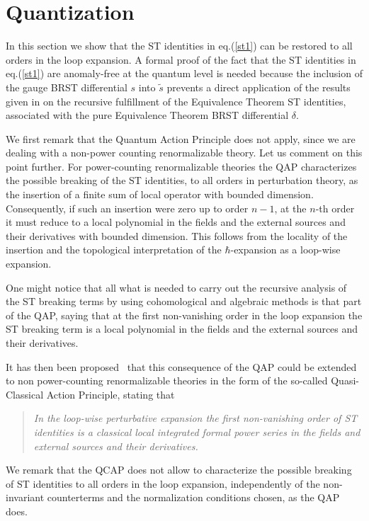 \documentclass[a4paper,11pt]{article}
\begin{document}
\section{Quantization}\label{sec4}

In this section we show that 
the ST identities in eq.(\ref{st1}) can be restored
to all orders in the loop expansion. 
A formal proof of the fact that the ST identities in eq.(\ref{st1}) 
are anomaly-free at the quantum level is needed because
the inclusion of the gauge BRST differential $s$ into $\tilde s$
prevents a direct application of the results given in \cite{ET}
on the recursive fulfillment of the Equivalence Theorem ST identities,
associated with the pure Equivalence Theorem 
BRST differential $\delta$.

We first remark that
the Quantum Action Principle \cite{qap1,qap2,qap3,qap4,Piguet:er} does not apply,
since we are dealing with a non-power counting renormalizable theory.
%
Let us comment on this point further.
For  power-counting renormalizable theories the QAP characterizes
 the possible breaking of the ST identities, to all orders in perturbation theory,
 as the insertion of a finite sum of local operator with bounded dimension.
Consequently, if such an insertion were zero up to order $n-1$,
 at the $n$-th order it must reduce to a local polynomial in the fields
 and the external sources and their derivatives with bounded dimension.
This follows from the locality of the insertion and the topological
 interpretation of the $\hbar$-expansion as a loop-wise expansion.

One might notice that all what is needed to carry out the recursive analysis
 of the ST breaking terms by using cohomological and 
 algebraic methods is that part
 of the QAP, saying that at the first non-vanishing order
 in the loop expansion the ST breaking term is a local polynomial
 in the fields and the external sources and their derivatives.

It has then been proposed~\cite{Stora2000} that this consequence
of the QAP could be extended to non power-counting renormalizable
theories in the form of the so-called 
Quasi-Classical Action Principle, stating that
%
\begin{quotation}
\noindent
{\em
In the loop-wise perturbative expansion the first non-vanishing order
 of ST identities is a classical local integrated formal power
 series in the fields and external sources and their derivatives.}
\end{quotation}
%
We remark that the QCAP does not allow to characterize the possible
breaking of ST identities to all orders in the loop expansion,
independently of the non-invariant counterterms and the normalization
conditions chosen, as the QAP does.
\end{document}
